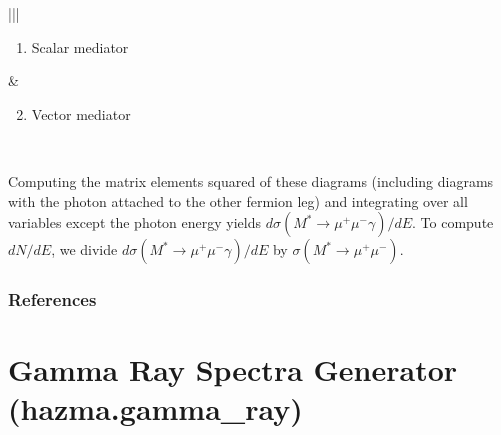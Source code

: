 \documentclass[letterpaper,10pt,english]{sphinxmanual}
\let\sphinxpxdimen\pdfpxdimen\else\newdimen\sphinxpxdimen
\begin{document}
\begin{savenotes}\sphinxattablestart
\centering
\begin{tabular}[t]{|*{2}{|}}
\hline
\begin{sphinxfigure-in-table}
\centering

\noindent{}
\end{sphinxfigure-in-table}\relax
\begin{enumerate}
\item {} 
Scalar mediator

\end{enumerate}
&\begin{sphinxfigure-in-table}
\centering

\noindent{}
\end{sphinxfigure-in-table}\relax
\begin{enumerate}
\setcounter{enumi}{1}
\item {} 
Vector mediator

\end{enumerate}
\\
\hline
\end{tabular}
\par
\sphinxattableend\end{savenotes}

Computing the matrix elements squared of these diagrams (including diagrams with the photon attached to the other fermion leg) and integrating over all variables except the photon energy yields \(d\sigma(M^*\to\mu^{+}\mu^{-}\gamma)/dE\). To compute \(dN/dE\), we divide \(d\sigma(M^*\to\mu^{+}\mu^{-}\gamma)/dE\) by \(\sigma(M^*\to\mu^{+}\mu^{-})\).

\noindent{\hspace*{\fill}\sphinxincludegraphics[width=800\sphinxpxdimen,height=800\sphinxpxdimen]{{muon_fsr}.png}\hspace*{\fill}}


\subsection{References}
\label{\detokenize{description:references}}

\chapter{Gamma Ray Spectra Generator (hazma.gamma\_ray)}
\label{\detokenize{gamma_ray:gamma-ray-spectra-generator-hazma-gamma-ray}}\label{\detokenize{gamma_ray::doc}}
\end{document}
